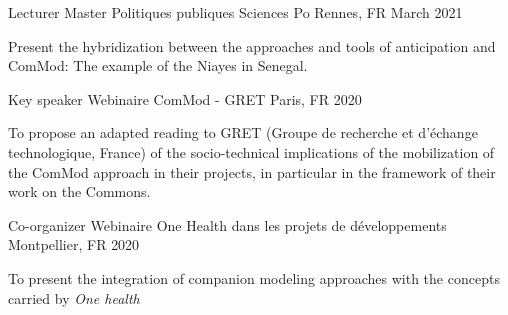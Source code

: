 

\begin{cventries}
  \cventry
    {Lecturer} %
    {Master Politiques publiques} %
    {Sciences Po Rennes, FR} %
    {March 2021} %
    {
      \begin{cvitems} %
      Present the hybridization between the approaches and tools of anticipation and ComMod: The example of the Niayes in Senegal.
      \end{cvitems}
    }
      \cventry
        {Key speaker} %
        {Webinaire ComMod - GRET} %
        {Paris, FR} %
        {2020} %
        {
          \begin{cvitems} %
            To propose an adapted reading to GRET (Groupe de recherche et d'échange technologique, France) of the socio-technical implications of the mobilization of the ComMod approach in their projects, in particular in the framework of their work on the Commons.
          \end{cvitems}
        }
      \cventry
        {Co-organizer} %
        {Webinaire One Health dans les projets de développements} %
        {Montpellier, FR} %
        {2020} %
        {
          \begin{cvitems} %
            To present the integration of companion modeling approaches with the concepts carried by \textit{One health}
          \end{cvitems}
        }


\end{cventries}
